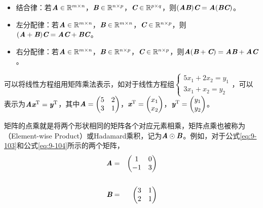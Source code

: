 \begin{itemize}
\vspace{0.5em}
\item 结合律：若${\textbf{\em A}}\in {\mathbb R}^{m\times n} $，$ {\textbf{\em B}}\in {\mathbb R}^{n\times p} $，${\textbf{\em C}}\in {\mathbb R}^{p\times q} $，则$ ({\textbf{\em A}}{\textbf{\em B}}){\textbf{\em C}}={\textbf{\em A}}({\textbf{\em B}}{\textbf{\em C}}) $。
\vspace{0.5em}
\item 左分配律：若$ {\textbf{\em A}}\in {\mathbb R}^{m\times n} $，$ {\textbf{\em B}}\in {\mathbb R}^{m\times n} $，$ {\textbf{\em C}}\in {\mathbb R}^{n\times p} $，则$ ({\textbf{\em A}}+{\textbf{\em B}}){\textbf{\em C}}={\textbf{\em A}}{\textbf{\em C}}+{\textbf{\em B}}{\textbf{\em C}} $。
\vspace{0.5em}
\item 右分配律：若$ {\textbf{\em A}}\in {\mathbb R}^{m\times n} $，$ {\textbf{\em B}}\in {\mathbb R}^{n\times p} $，$ {\textbf{\em C}}\in {\mathbb R}^{n\times p} $，则$ {\textbf{\em A}}({\textbf{\em B}}+{\textbf{\em C}})={\textbf{\em A}}{\textbf{\em B}}+{\textbf{\em A}}{\textbf{\em C}} $。
\vspace{0.5em}
\end{itemize}

\begin{spacing}{1.4}
\parinterval 可以将线性方程组用矩阵乘法表示，如对于线性方程组$ \begin{cases} 5x_1+2x_2=y_1\\3x_1+x_2=y_2\end{cases} $，可以表示为$ {\textbf{\em A}}{\textbf{\em x}}^{\textrm T}={\textbf{\em y}}^{\textrm T}$，其中$ {\textbf{\em A}} = \begin{pmatrix} 5 & 2\\3 & 1\end{pmatrix} $，$ {\textbf{\em x}}^{\textrm T} = \begin{pmatrix} x_1\\x_2\end{pmatrix} $，$ {\textbf{\em y}}^{\textrm T} = \begin{pmatrix} y_1\\y_2\end{pmatrix} $。
\end{spacing}

\parinterval 矩阵的点乘就是将两个形状相同的矩阵各个对应元素相乘，矩阵点乘也被称为{\small{}}（Element-wise Product）或Hadamard乘积，记为${\textbf{\em A}}\odot {\textbf{\em B}}$。例如，对于公式\eqref{eq:9-103}和公式\eqref{eq:9-104}所示的两个矩阵，
\begin{eqnarray}
{\textbf{\em A}} &=&
\begin{pmatrix}
   1 & 0\\
   -1 & 3
\end{pmatrix}
\label{eq:9-103}
\\ \nonumber \\
{\textbf{\em B}} &=&
\begin{pmatrix}
   3 & 1\\
   2 & 1
\end{pmatrix}
\label{eq:9-104}
\end{eqnarray}

